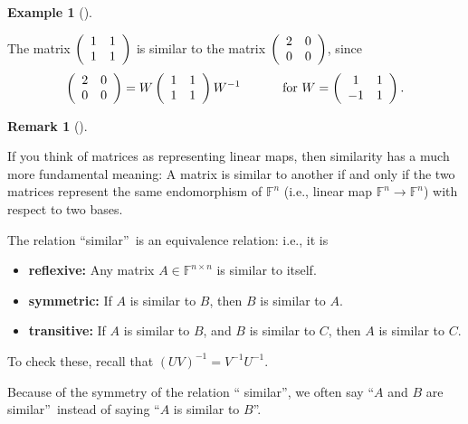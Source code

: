\documentclass[numbers=enddot,12pt,final,onecolumn,notitlepage]{scrartcl}%
\numberwithin{exer}{subsection}
\theoremstyle{definition}
\newtheorem{remk}[theo]{Remark}
\newenvironment{remark}[1][]
{\begin{remk}[#1]\begin{leftbar}}
{\end{leftbar}\end{remk}}
\newtheorem{exam}[theo]{Example}
\newenvironment{example}[1][]
{\begin{exam}[#1]\begin{leftbar}}
{\end{leftbar}\end{exam}}
\begin{document}
\begin{example}
The matrix $\left(
\begin{array}
[c]{cc}%
1 & 1\\
1 & 1
\end{array}
\right)  $ is similar to the matrix $\left(
\begin{array}
[c]{cc}%
2 & 0\\
0 & 0
\end{array}
\right)  $, since
\[
\left(
\begin{array}
[c]{cc}%
2 & 0\\
0 & 0
\end{array}
\right)  =W\left(
\begin{array}
[c]{cc}%
1 & 1\\
1 & 1
\end{array}
\right)  W^{-1}\ \ \ \ \ \ \ \ \ \ \text{for }W=\left(
\begin{array}
[c]{cc}%
1 & 1\\
-1 & 1
\end{array}
\right)  .
\]

\end{example}

\begin{remark}
If you think of matrices as representing linear maps, then similarity has a
much more fundamental meaning: A matrix is similar to another if and only if
the two matrices represent the same endomorphism of $\mathbb{F}^{n}$ (i.e.,
linear map $\mathbb{F}^{n}\rightarrow\mathbb{F}^{n}$) with respect to two bases.
\end{remark}

The relation \textquotedblleft similar\textquotedblright\ is an equivalence
relation: i.e., it is

\begin{itemize}
\item \textbf{reflexive:} Any matrix $A\in\mathbb{F}^{n\times n}$ is similar
to itself.

\item \textbf{symmetric:} If $A$ is similar to $B$, then $B$ is similar to $A$.

\item \textbf{transitive:} If $A$ is similar to $B$, and $B$ is similar to
$C$, then $A$ is similar to $C$.
\end{itemize}

To check these, recall that $\left(  UV\right)  ^{-1}=V^{-1}U^{-1}$.

Because of the symmetry of the relation \textquotedblleft
similar\textquotedblright, we often say \textquotedblleft$A$ and $B$ are
similar\textquotedblright\ instead of saying \textquotedblleft$A$ is similar
to $B$\textquotedblright.
\end{document}
